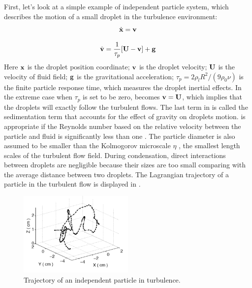 First, let's look at a simple example of independent particle system, which describes the motion of a small droplet in the turbulence environment:
\begin{equation}
\dot{\mathbf{x}}=\mathbf{v}\label{droplet_x_eqn}
\end{equation}

\begin{equation}
\dot{\mathbf{v}}=\frac{1}{\tau_{p}}[\mathbf{U}-\mathbf{v}]+\mathbf{g}\label{droplet_v_eqn}
\end{equation}
Here $\mathbf{x}$ is the droplet position coordinate; 
$\mathbf{v}$ is the droplet velocity; $\mathbf{U}$ is the velocity of fluid field;
$\mathbf{g}$ is the gravitational acceleration; $\tau_{p}=2\rho_{l}R^{2}/(9\rho_{0}\nu)$ is the finite particle response time, which measures the droplet inertial
effects. In the extreme case when $\tau_{p}$ is set to be zero, 
becomes $\mathbf{v}=\mathbf{U}$, which implies that the
droplets will exactly follow the turbulent flows. The last term in  is called the sedimentation term that accounts for the effect of
gravity on droplets motion.  is appropriate if the
Reynolds number based on the relative velocity between the particle and fluid
is significantly less than one \cite{Eaton1994}. The particle diameter is also
assumed to be smaller than the Kolmogorov microscale $\eta$ \cite{PopeTurbulent2000}, the smallest
length scales of the turbulent flow field. During condensation, direct
interactions between droplets are negligible because their sizes are too small
comparing with the average distance between two droplets. The Lagrangian trajectory of a particle in the turbulent flow is displayed in .
\begin{figure}
\centering
\includegraphics[width=0.5\textwidth]{Figures/Lagrangian_trajectory}
\caption{Trajectory of an independent particle in turbulence.}
\label{fig:lag_traj}
\end{figure}

